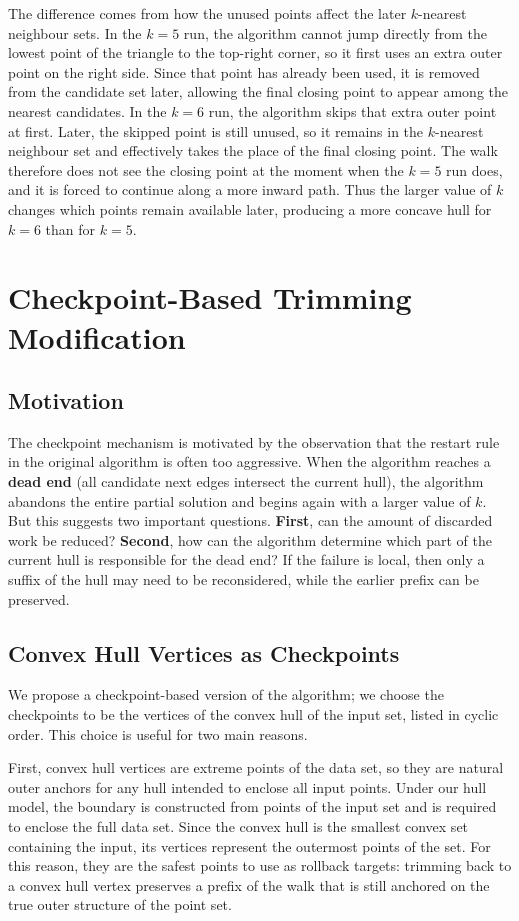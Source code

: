 \documentclass[10pt,twocolumn]{article}
\begin{document}
The difference comes from how the unused points affect the later \(k\)-nearest neighbour sets. In the \(k=5\) run, the algorithm cannot jump directly from the lowest point of the triangle to the top-right corner, so it first uses an extra outer point on the right side. Since that point has already been used, it is removed from the candidate set later, allowing the final closing point to appear among the nearest candidates. In the \(k=6\) run, the algorithm skips that extra outer point at first. Later, the skipped point is still unused, so it remains in the \(k\)-nearest neighbour set and effectively takes the place of the final closing point. The walk therefore does not see the closing point at the moment when the \(k=5\) run does, and it is forced to continue along a more inward path. Thus the larger value of \(k\) changes which points remain available later, producing a more concave hull for \(k=6\) than for \(k=5\).


\section{Checkpoint-Based Trimming Modification}
\subsection{Motivation}
The checkpoint mechanism is motivated by the observation that the restart rule in the original algorithm is often too aggressive. When the algorithm reaches a \textbf{dead end} (all candidate next edges intersect the current hull), the algorithm abandons the entire partial solution and begins again with a larger value of $k$. But this suggests two important questions. \textbf{First}, can the amount of discarded work be reduced? \textbf{Second}, how can the algorithm determine which part of the current hull is responsible for the dead end? If the failure is local, then only a suffix of the hull may need to be reconsidered, while the earlier prefix can be preserved.
\subsection{Convex Hull Vertices as Checkpoints}
We propose a checkpoint-based version of the algorithm; we choose the checkpoints to be the vertices of the convex hull of the input set, listed in cyclic order. This choice is useful for two main reasons.

First, convex hull vertices are extreme points of the data set, so they are natural outer anchors for any hull intended to enclose all input points. Under our hull model, the boundary is constructed from points of the input set and is required to enclose the full data set. Since the convex hull is the smallest convex set containing the input, its vertices represent the outermost points of the set. For this reason, they are the safest points to use as rollback targets: trimming back to a convex hull vertex preserves a prefix of the walk that is still anchored on the true outer structure of the point set.
\end{document}
